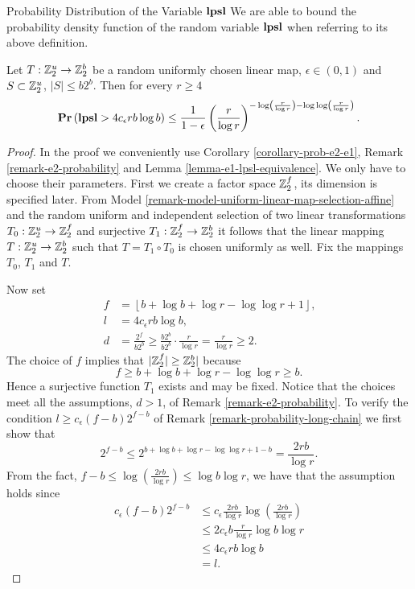 \begin{section}{Probability Distribution of the Variable \texorpdfstring{$\mathbf{lpsl}$}{lpsl}}
We are able to bound the probability density function of the random variable $\mathbf{lpsl}$ when referring to its above definition.
\begin{remark}
\label{remark-probability-long-chain}
Let $T: \mathbb{Z}_{2}^{u} \rightarrow \mathbb{Z}_{2}^{b}$ be a random uniformly chosen linear map, $\epsilon \in (0, 1)$ and $S \subset \mathbb{Z}_{2}^{u}$, $|S| \leq b 2 ^ b$. Then for every $r \geq 4$
\[
	\mathbf{Pr}\left(\mathbf{lpsl} > 4 c_\epsilon r b \log b\right) \leq \frac{1}{1 - \epsilon} \left(\frac{r}{\log r}\right)^{-\log \left(\frac{r}{\log r}\right) - \log \log \left(\frac{r}{\log r}\right)} \text{.}
\]
\end{remark}
\begin{proof}
In the proof we conveniently use Corollary \ref{corollary-prob-e2-e1}, Remark \ref{remark-e2-probability} and Lemma \ref{lemma-e1-lpsl-equivalence}. We only have to choose their parameters. First we create a factor space $\mathbb{Z}_{2}^{f}$, its dimension is specified later. From Model \ref{remark-model-uniform-linear-map-selection-affine} and the random uniform and independent selection of two linear transformations $T_0: \mathbb{Z}_{2}^{u} \rightarrow \mathbb{Z}_{2}^{f}$ and surjective $T_1: \mathbb{Z}_{2}^{f} \rightarrow \mathbb{Z}_{2}^{b}$ it follows that the linear mapping $T: \mathbb{Z}_{2}^{u} \rightarrow \mathbb{Z}_{2}^{b}$ such that $T = T_1 \circ T_0$ is chosen uniformly as well. Fix the mappings $T_0$, $T_1$ and $T$.

Now set 
\[
\begin{split}
	f & = \left\lfloor b + \log b + \log r - \log \log r + 1 \right\rfloor \text{,} \\
	l & = 4c_{\epsilon}r b \log b \text{,} \\
	d & = \frac{2 ^ f}{b 2 ^ b} \geq \frac{b 2 ^ b}{b 2 ^ b} \cdot \frac{r}{\log r} = \frac{r}{\log r} \geq 2 \text{.}
\end{split}
\]
The choice of $f$ implies that $|\mathbb{Z}_{2}^{f}| \geq \mathbb{Z}_{2}^{b}|$ because 
\[ 
f \geq b + \log b + \log r - \log \log r \geq b \text{.}
\]
Hence a surjective function $T_1$ exists and may be fixed. Notice that the choices meet all the assumptions, $d > 1$, of Remark \ref{remark-e2-probability}. To verify the condition $l \geq c_\epsilon (f - b) 2 ^ {f - b}$ of Remark \ref{remark-probability-long-chain} we first show that
\[
	2 ^ {f - b} \leq 2 ^ {b + \log b + \log r - \log \log r + 1 - b} = \frac{2 r b}{\log r} \text{.}
\]
From the fact, $f - b \leq \log \left(\frac{2 r b}{\log r}\right) \leq \log b \log r$, we have that the assumption holds since
\[
\begin{split}
c_{\epsilon}(f - b) 2 ^ {f - b}
	& \leq c_{\epsilon} \frac{2 r b}{\log r} \log \left(\frac{2 r b}{\log r}\right) \\
	& \leq 2 c_{\epsilon} b \frac{r}{\log r} \log b \log r \\
	& \leq 4 c_{\epsilon} r b \log b \\
	& = l \text{.}
\end{split}
\]


\end{proof}
\end{section}
